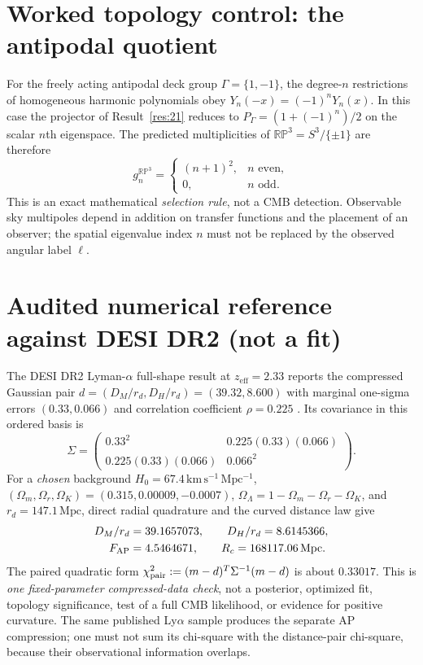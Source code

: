 \documentclass[aps,prd,onecolumn,notitlepage,groupedaddress,11pt]{revtex4-2}
\begin{document}
\section{Worked topology control: the antipodal quotient}
For the freely acting antipodal deck group $\Gamma=\{1,-1\}$, the degree-$n$ restrictions of homogeneous harmonic polynomials obey $Y_n(-x)=(-1)^nY_n(x)$. In this case the projector of Result~\ref{res:21} reduces to $P_\Gamma=(1+(-1)^n)/2$ on the scalar $n$th eigenspace. The predicted multiplicities of $\mathbb{RP}^3=S^3/\{\pm 1\}$ are therefore
\begin{equation}\label{eq:rp3control}
g_n^{\mathbb{RP}^3}=\begin{cases}(n+1)^2,&n\text{ even},\\0,&n\text{ odd}.\end{cases}
\end{equation}
This is an exact mathematical \emph{selection rule}, not a CMB detection. Observable sky multipoles depend in addition on transfer functions and the placement of an observer; the spatial eigenvalue index $n$ must not be replaced by the observed angular label $\ell$.
\section{Audited numerical reference against DESI DR2 (not a fit)}
The DESI DR2 Lyman-$\alpha$ full-shape result at $z_\mathrm{eff}=2.33$ reports the compressed Gaussian pair $d=(D_M/r_d,D_H/r_d)=(39.32,8.600)$ with marginal one-sigma errors $(0.33,0.066)$ and correlation coefficient $\rho=0.225$ \cite{DESI2026}. Its covariance in this ordered basis is
\begin{equation}\label{eq:desicov}
\Sigma=\begin{pmatrix}0.33^2&0.225(0.33)(0.066)\\0.225(0.33)(0.066)&0.066^2\end{pmatrix}.
\end{equation}
For a \emph{chosen} background $H_0=67.4\,\mathrm{km\,s^{-1}\,Mpc^{-1}}$, $(\Omega_m,\Omega_r,\Omega_K)=(0.315,0.00009,-0.0007)$, $\Omega_\Lambda=1-\Omega_m-\Omega_r-\Omega_K$, and $r_d=147.1\,\mathrm{Mpc}$, direct radial quadrature and the curved distance law give
\begin{equation}\label{eq:desicalc}
\begin{split}
D_M/r_d&=39.1657073,\qquad D_H/r_d=8.6145366,\\
F_{\rm AP}&=4.5464671,\qquad R_c=168117.06\,\mathrm{Mpc}.
\end{split}
\end{equation}
The paired quadratic form $\chi^2_{\rm pair}:=(m-d)^T\Sigma^{-1}(m-d)$ is about $0.33017$. This is \emph{one fixed-parameter compressed-data check}, not a posterior, optimized fit, topology significance, test of a full CMB likelihood, or evidence for positive curvature. The same published Ly$\alpha$ sample produces the separate AP compression; one must not sum its chi-square with the distance-pair chi-square, because their observational information overlaps.
\end{document}
